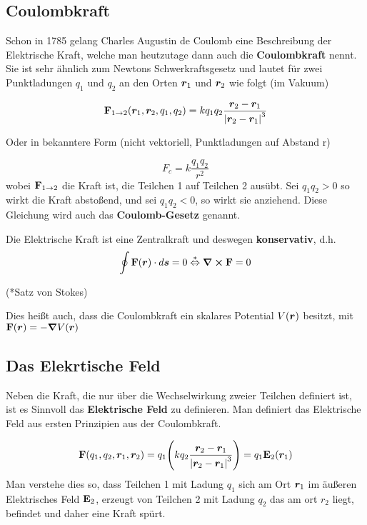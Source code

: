 \subsection{Coulombkraft}%
\label{ssub:Coulombkraft}
Schon in 1785 gelang Charles Augustin de Coulomb eine Beschreibung der
Elektrische Kraft, welche man heutzutage dann auch die 
\textbf{Coulombkraft} 
nennt. Sie ist sehr ähnlich zum Newtons Schwerkraftsgesetz und lautet für 
zwei Punktladungen $q_1$ und $q_2$ an den Orten $\vb*r_1$ und $\vb*r_2$ wie 
folgt (im Vakuum)

\begin{equation}
  \vb F_{1\to2}(\vb*r_1, \vb*r_2, q_1, q_2)= k q_1 q_2 \frac{\vb*r_2-\vb*r_1}{\abs{\vb*r_2-\vb*r_1}^3} 
\end{equation}

\noindent
\begin{center}
Oder in bekanntere Form (nicht vektoriell, Punktladungen auf Abstand r)
\end{center}
\begin{equation*}
  F_c = k \frac{q_1 q_2}{r^2} 
\end{equation*}
wobei $\vb F_{1\to2}$ die Kraft ist, die Teilchen 1 auf Teilchen 2 ausübt. 
Sei $q_1q_2>0$ so wirkt die Kraft abstoßend, 
und sei $q_1q_2<0$, so wirkt sie anziehend. Diese Gleichung wird auch das
\textbf{Coulomb-Gesetz} genannt. 

\noindent
Die Elektrische Kraft ist eine Zentralkraft und deswegen 
\textbf{konservativ}, d.h. 
\begin{equation}
  \oint \vb F(\vb* r) \cdot d\vb*s = 0 \stackrel{*}{\Leftrightarrow} \curl \vb F =0
\end{equation}
\begin{center}
(*Satz von Stokes)
\end{center}
Dies heißt auch, dass die Coulombkraft ein skalares Potential $V(\vb*r)$ besitzt, mit
$\vb F(\vb*r)=-\grad V(\vb*r)$

\subsection{Das Elekrtische Feld}%
\label{ssub:E-feld}
Neben die Kraft, die nur über die Wechselwirkung zweier Teilchen definiert
ist, ist es Sinnvoll das \textbf{Elektrische Feld} zu definieren. Man 
definiert das Elektrische Feld aus ersten Prinzipien aus der Coulombkraft.

\begin{equation*}
  \vb F(q_1, q_2, \vb*r_1, \vb*r_2) 
  = 
  q_1 
  \qty(k q_2 \frac{\vb*r_2 - \vb*r_1}{\abs{\vb*r_2 - \vb*r_1}^3})
  = q_1 \vb E_2(\vb*r_1)
\end{equation*}
Man verstehe dies so, dass Teilchen 1 mit Ladung $q_1$ 
sich am Ort $\vb*r_1$ im äußeren Elektrisches Feld $\vb E_2$, 
erzeugt von Teilchen 2 mit 
Ladung $q_2$ das am ort $r_2$ liegt, befindet und daher eine Kraft spürt.

